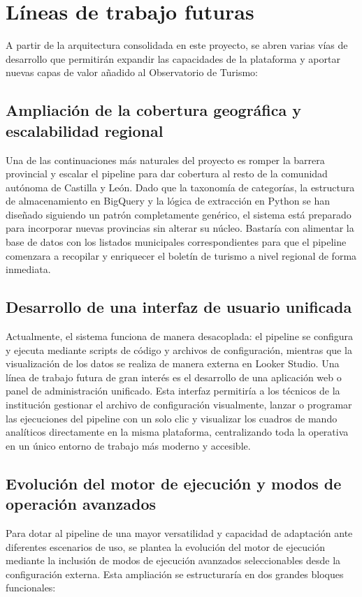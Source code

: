 \section{Líneas de trabajo futuras}
A partir de la arquitectura consolidada en este proyecto, se abren varias vías de desarrollo que permitirán expandir las capacidades de la plataforma y aportar nuevas capas de valor añadido al Observatorio de Turismo:

\subsection{Ampliación de la cobertura geográfica y escalabilidad regional}
Una de las continuaciones más naturales del proyecto es romper la barrera provincial y escalar el pipeline para dar cobertura al resto de la comunidad autónoma de Castilla y León. Dado que la taxonomía de categorías, la estructura de almacenamiento en BigQuery y la lógica de extracción en Python se han diseñado siguiendo un patrón completamente genérico, el sistema está preparado para incorporar nuevas provincias sin alterar su núcleo. Bastaría con alimentar la base de datos con los listados municipales correspondientes para que el pipeline comenzara a recopilar y enriquecer el boletín de turismo a nivel regional de forma inmediata.

\subsection{Desarrollo de una interfaz de usuario unificada}
Actualmente, el sistema funciona de manera desacoplada: el pipeline se configura y ejecuta mediante scripts de código y archivos de configuración, mientras que la visualización de los datos se realiza de manera externa en Looker Studio. Una línea de trabajo futura de gran interés es el desarrollo de una aplicación web o panel de administración unificado. Esta interfaz permitiría a los técnicos de la institución gestionar el archivo de configuración visualmente, lanzar o programar las ejecuciones del pipeline con un solo clic y visualizar los cuadros de mando analíticos directamente en la misma plataforma, centralizando toda la operativa en un único entorno de trabajo más moderno y accesible.

\subsection{Evolución del motor de ejecución y modos de operación avanzados}
Para dotar al pipeline de una mayor versatilidad y capacidad de adaptación ante diferentes escenarios de uso, se plantea la evolución del motor de ejecución mediante la inclusión de modos de ejecución avanzados seleccionables desde la configuración externa. Esta ampliación se estructuraría en dos grandes bloques funcionales:

